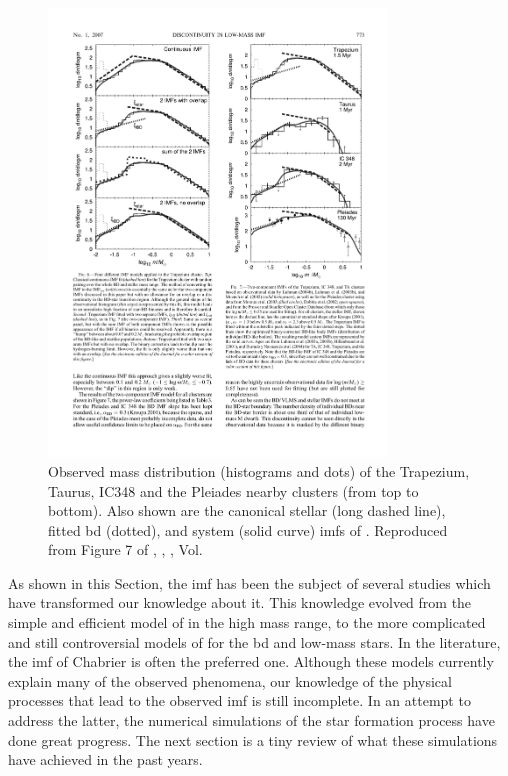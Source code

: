  \begin{figure}[htbp]
\begin{center}
\includegraphics[width=0.8\textwidth]{background/Figures/F7_Thies2007.pdf}
\caption{Observed mass distribution (histograms and dots) of the Trapezium, Taurus, IC348 and the Pleiades nearby clusters (from top to bottom). Also shown are the canonical stellar (long dashed line), fitted \gls{bd} (dotted), and system (solid curve) \glspl{imf} of \citet{Thies2007} . Reproduced from Figure 7 of \citet{Thies2007}, \textit{}, , Vol. }
\label{fig:IMFThies2007}
\end{center}
\end{figure}
 
As shown in this Section, the \gls{imf} has been the subject of several studies which have transformed our knowledge about it. This knowledge evolved from the simple and efficient model of \citet{Salpeter1955} in the high mass range, to the more complicated and still controversial models of \citet{Thies2007, 2013pss5.book..115K} for the \gls{bd} and low-mass stars. In the literature, the \gls{imf} of Chabrier \citep{Chabrier2003a,Chabrier2003b,Chabrier2005} is often the preferred one. Although these models currently explain many of the observed phenomena, our knowledge of the physical processes that lead to the observed \gls{imf} is still incomplete. In an attempt to address the latter, the numerical simulations of the star formation process have done great progress. The next section is a tiny review of what these simulations have achieved in the past years.


